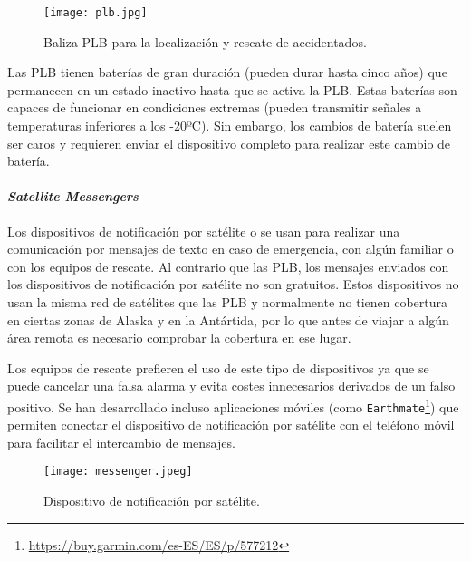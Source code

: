 \begin{figure}[!h]
\begin{center}
\texttt{[image: plb.jpg]}
\caption{Baliza \ac{PLB} para la localización y rescate de accidentados. \protect\footnotemark}
\label{fig:plb}
\end{center}
\end{figure}


Las \ac{PLB} tienen baterías de gran duración (pueden durar hasta cinco años) que permanecen en un estado inactivo hasta que se activa la \ac{PLB}. Estas baterías son capaces de funcionar en condiciones extremas (pueden transmitir señales a temperaturas inferiores a los -20ºC). Sin embargo, los cambios de batería suelen ser caros y requieren enviar el dispositivo completo para realizar este cambio de batería. 

\paragraph{\textit{Satellite Messengers}}

Los dispositivos de notificación por satélite o  \cite{42} se usan para realizar una comunicación por mensajes de texto en caso de emergencia, con algún familiar o con los equipos de rescate. Al contrario que las \ac{PLB}, los mensajes enviados con los dispositivos de notificación por satélite no son gratuitos. Estos dispositivos no usan la misma red de satélites que las \ac{PLB} y normalmente no tienen cobertura en ciertas zonas de Alaska y en la Antártida, por lo que antes de viajar a algún área remota es necesario comprobar la cobertura en ese lugar.

Los equipos de rescate prefieren el uso de este tipo de dispositivos ya que se puede cancelar una falsa alarma y evita costes innecesarios derivados de un falso positivo. Se han desarrollado incluso aplicaciones móviles (como \texttt{Earthmate}\footnote{\url{https://buy.garmin.com/es-ES/ES/p/577212}}) que permiten conectar el dispositivo de notificación por satélite con el teléfono móvil para facilitar el intercambio de mensajes.

\begin{figure}[!h]
\begin{center}
\texttt{[image: messenger.jpeg]}
\caption{Dispositivo de notificación por satélite. \protect\footnotemark}
\label{fig:messenger}
\end{center}
\end{figure}


